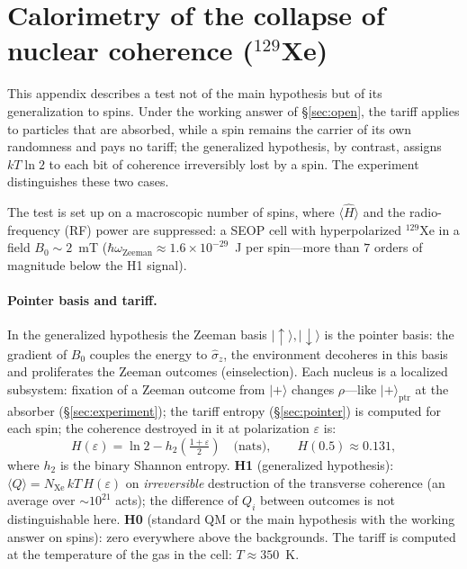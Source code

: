 \documentclass[11pt,a4paper]{article}
\newcommand{\Sref}[1]{\hyperref[#1]{\S\ref{#1}}}
\begin{document}
\section{Calorimetry of the collapse of nuclear coherence ($^{129}$Xe)}\label{app:xe}

This appendix describes a test not of the main hypothesis but of its generalization to spins. Under the working answer of \Sref{sec:open}, the tariff applies to particles that are absorbed, while a spin remains the carrier of its own randomness and pays no tariff; the generalized hypothesis, by contrast, assigns $kT\ln 2$ to each bit of coherence irreversibly lost by a spin. The experiment distinguishes these two cases.

The test is set up on a macroscopic number of spins, where $\langle\hat{H}\rangle$ and the radio-frequency (RF) power are suppressed: a SEOP cell with hyperpolarized $^{129}$Xe in a field $B_0 \sim 2$~mT ($\hbar\omega_{\mathrm{Zeeman}} \approx 1.6\times 10^{-29}$~J per spin---more than $7$ orders of magnitude below the H1 signal).

\paragraph{Pointer basis and tariff.}
In the generalized hypothesis the Zeeman basis $|{\uparrow}\rangle,|{\downarrow}\rangle$ is the pointer basis: the gradient of $B_0$ couples the energy to $\hat\sigma_z$, the environment decoheres in this basis and proliferates the Zeeman outcomes (einselection). Each nucleus is a localized subsystem: fixation of a Zeeman outcome from $|{+}\rangle$ changes $\rho$---like $|{+}\rangle_{\mathrm{ptr}}$ at the absorber (\Sref{sec:experiment}); the tariff entropy (\Sref{sec:pointer}) is computed for each spin; the coherence destroyed in it at polarization $\varepsilon$ is:
\begin{equation}
H(\varepsilon) = \ln 2 - h_2\!\left(\tfrac{1+\varepsilon}{2}\right) \quad \text{(nats)}, \qquad H(0.5) \approx 0.131,
\end{equation}
where $h_2$ is the binary Shannon entropy. \textbf{H1} (generalized hypothesis): $\langle Q\rangle = N_{\mathrm{Xe}}\, k T\, H(\varepsilon)$ on \emph{irreversible} destruction of the transverse coherence (an average over $\sim 10^{21}$ acts); the difference of $Q_i$ between outcomes is not distinguishable here. \textbf{H0} (standard QM or the main hypothesis with the working answer on spins): zero everywhere above the backgrounds. The tariff is computed at the temperature of the gas in the cell: $T \approx 350$~K.
\end{document}
